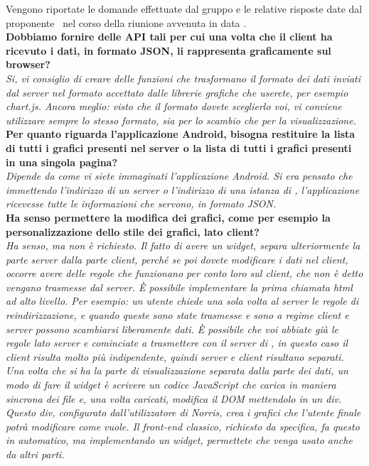 	Vengono riportate le domande effettuate dal gruppo \groupname{} e le relative risposte date dal proponente \proponente\, nel corso della riunione avvenuta in data .\\

	\textbf{Dobbiamo fornire delle API tali per cui una volta che il client ha ricevuto i dati, in formato JSON, li rappresenta graficamente sul browser?}\\
	\textit{Si, vi consiglio di creare delle funzioni che trasformano il formato dei dati inviati dal server nel formato accettato dalle librerie grafiche che userete, per esempio chart.js. Ancora meglio: visto che il formato dovete sceglierlo voi, vi conviene utilizzare sempre lo stesso formato, sia per lo scambio che per la visualizzazione.}\\

	\textbf{Per quanto riguarda l'applicazione Android, bisogna restituire la lista di tutti i grafici presenti nel server o la lista di tutti i grafici presenti in una singola pagina?}\\
	\textit{Dipende da come vi siete immaginati l'applicazione Android. Si era pensato che immettendo l'indirizzo di un server o l'indirizzo di una istanza di \projectname{}, l'applicazione ricevesse tutte le informazioni che servono, in formato JSON.}\\

	\textbf{Ha senso permettere la modifica dei grafici, come per esempio la personalizzazione dello stile dei grafici, lato client?}\\
	\textit{Ha senso, ma non è richiesto. Il fatto di avere un widget, separa ulteriormente la parte server dalla parte client, perché se poi dovete modificare i dati nel client, occorre avere delle regole che funzionano per conto loro sul client, che non è detto vengano trasmesse dal server. \`{E} possibile implementare la prima chiamata html ad alto livello. Per esempio: un utente chiede una sola volta al server le regole di reindirizzazione, e quando queste sono state trasmesse e sono a regime client e server possono scambiarsi liberamente dati. \`{E} possibile che voi abbiate già le regole lato server e cominciate a trasmettere con il server di \projectname{}, in questo caso il client risulta molto più indipendente, quindi server e client risultano separati. Una volta che si ha la parte di visualizzazione separata dalla parte dei dati, un modo di fare il widget è scrivere un codice JavaScript che carica in maniera sincrona dei file e, una volta caricati, modifica il DOM mettendolo in un div. Questo div, configurato dall'utilizzatore di Norris, crea i grafici che l'utente finale potrà modificare come vuole. Il front-end classico, richiesto da specifica, fa questo in automatico, ma implementando un widget, permettete che venga usato anche da altri parti.}\\
